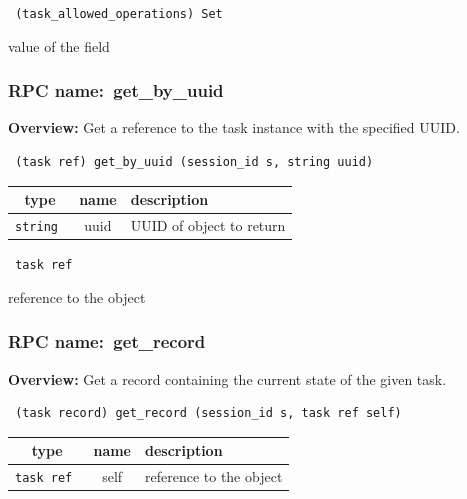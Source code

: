 \vspace{0.3cm}

{\tt 
(task\_allowed\_operations) Set
}


value of the field
\vspace{0.3cm}
\vspace{0.3cm}
\vspace{0.3cm}
\subsubsection{RPC name:~get\_by\_uuid}

{\bf Overview:} 
Get a reference to the task instance with the specified UUID.

\begin{verbatim} (task ref) get_by_uuid (session_id s, string uuid)\end{verbatim}



 
\vspace{0.3cm}
\begin{tabular}{|c|c|p{7cm}|}
 \hline
{\bf type} & {\bf name} & {\bf description} \\ \hline
{\tt string } & uuid & UUID of object to return \\ \hline 

\end{tabular}

\vspace{0.3cm}

{\tt 
task ref
}


reference to the object
\vspace{0.3cm}
\vspace{0.3cm}
\vspace{0.3cm}
\subsubsection{RPC name:~get\_record}

{\bf Overview:} 
Get a record containing the current state of the given task.

\begin{verbatim} (task record) get_record (session_id s, task ref self)\end{verbatim}



 
\vspace{0.3cm}
\begin{tabular}{|c|c|p{7cm}|}
 \hline
{\bf type} & {\bf name} & {\bf description} \\ \hline
{\tt task ref } & self & reference to the object \\ \hline 

\end{tabular}

